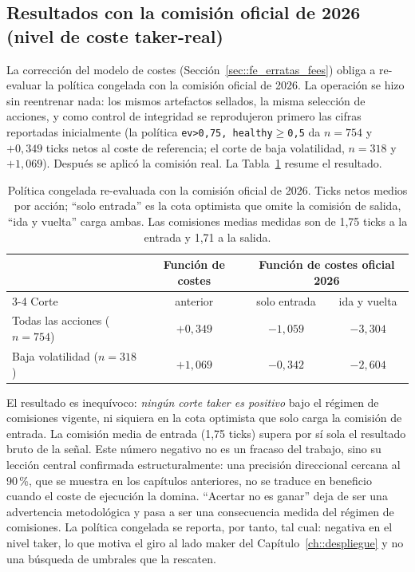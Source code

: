 \subsection{Resultados con la comisión oficial de 2026 (nivel de coste taker-real)}
\label{sec::taker_real}

La corrección del modelo de costes (Sección~\ref{sec::fe_erratas_fees}) obliga a
re-evaluar la política congelada con la comisión oficial de 2026. La operación se hizo sin
reentrenar nada: los mismos artefactos sellados, la misma selección de acciones, y como
control de integridad se reprodujeron primero las cifras reportadas inicialmente (la política
\texttt{ev>0{,}75, healthy\(\ge\)0{,}5} da $n=754$ y $+0{,}349$ ticks netos al coste de
referencia; el corte de baja volatilidad, $n=318$ y $+1{,}069$). Después se aplicó la
comisión real. La Tabla~\ref{tab::taker_real} resume el resultado.

\begin{table}[htbp]
\centering
\caption{Política congelada re-evaluada con la comisión oficial de 2026. Ticks netos
medios por acción; ``solo entrada'' es la cota optimista que omite la comisión de salida,
``ida y vuelta'' carga ambas. Las comisiones medias medidas son de 1,75 ticks a la entrada
y 1,71 a la salida.}
\label{tab::taker_real}
\begin{tabular}{lccc}
\toprule
 & Función de costes & \multicolumn{2}{c}{Función de costes oficial 2026} \\
\cmidrule(lr){3-4}
Corte & anterior & solo entrada & ida y vuelta \\
\midrule
Todas las acciones ($n=754$) & $+0{,}349$ & $-1{,}059$ & $-3{,}304$ \\
Baja volatilidad ($n=318$) & $+1{,}069$ & $-0{,}342$ & $-2{,}604$ \\
\bottomrule
\end{tabular}
\end{table}

El resultado es inequívoco: \emph{ningún corte taker es positivo} bajo el régimen de
comisiones vigente, ni siquiera en la cota optimista que solo carga la comisión de
entrada. La comisión media de entrada (1,75 ticks) supera por sí sola el resultado bruto
de la señal. Este número negativo no es un fracaso del trabajo, sino su lección central
confirmada estructuralmente: una precisión direccional cercana al 90\,\%, que se muestra
en los capítulos anteriores, no se traduce en beneficio cuando el coste de ejecución la
domina. ``Acertar no es ganar'' deja de ser una advertencia metodológica y pasa a ser una
consecuencia medida del régimen de comisiones. La política congelada se reporta, por
tanto, tal cual: negativa en el nivel taker, lo que motiva el giro al lado maker del
Capítulo~\ref{ch::despliegue} y no una búsqueda de umbrales que la rescaten.


